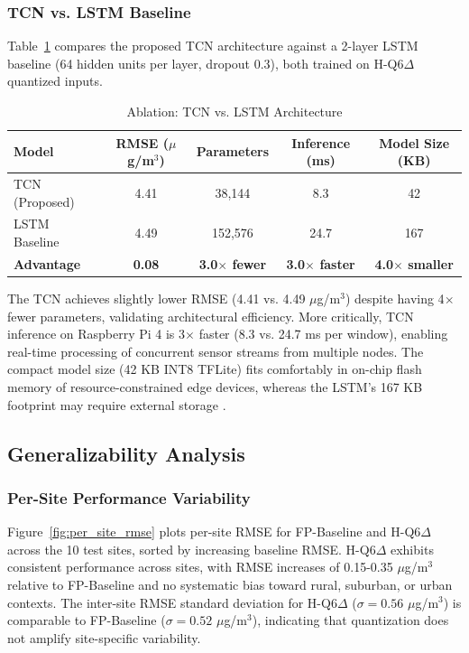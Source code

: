 \subsubsection{TCN vs. LSTM Baseline}

Table~\ref{tab:ablation_tcn_lstm} compares the proposed TCN architecture against a 2-layer LSTM baseline (64 hidden units per layer, dropout 0.3), both trained on H-Q6$\Delta$ quantized inputs.

\begin{table}[h]
\centering
\caption{Ablation: TCN vs. LSTM Architecture}
\label{tab:ablation_tcn_lstm}
\begin{tabular}{lcccc}
\toprule
\textbf{Model} & \textbf{RMSE ($\mu$g/m$^3$)} & \textbf{Parameters} & \textbf{Inference (ms)} & \textbf{Model Size (KB)} \\
\midrule
TCN (Proposed) & 4.41 & 38,144 & 8.3 & 42 \\
LSTM Baseline & 4.49 & 152,576 & 24.7 & 167 \\
\midrule
\textbf{Advantage} & \textbf{0.08} & \textbf{3.0$\times$ fewer} & \textbf{3.0$\times$ faster} & \textbf{4.0$\times$ smaller} \\
\bottomrule
\end{tabular}
\end{table}

The TCN achieves slightly lower RMSE (4.41 vs. 4.49 $\mu$g/m$^3$) despite having 4$\times$ fewer parameters, validating architectural efficiency. More critically, TCN inference on Raspberry Pi 4 is 3$\times$ faster (8.3 vs. 24.7 ms per window), enabling real-time processing of concurrent sensor streams from multiple nodes. The compact model size (42 KB INT8 TFLite) fits comfortably in on-chip flash memory of resource-constrained edge devices, whereas the LSTM's 167 KB footprint may require external storage \cite{mazinani2025air}.

\subsection{Generalizability Analysis}

\subsubsection{Per-Site Performance Variability}

Figure~\ref{fig:per_site_rmse} plots per-site RMSE for FP-Baseline and H-Q6$\Delta$ across the 10 test sites, sorted by increasing baseline RMSE. H-Q6$\Delta$ exhibits consistent performance across sites, with RMSE increases of 0.15-0.35 $\mu$g/m$^3$ relative to FP-Baseline and no systematic bias toward rural, suburban, or urban contexts. The inter-site RMSE standard deviation for H-Q6$\Delta$ ($\sigma = 0.56$ $\mu$g/m$^3$) is comparable to FP-Baseline ($\sigma = 0.52$ $\mu$g/m$^3$), indicating that quantization does not amplify site-specific variability.

